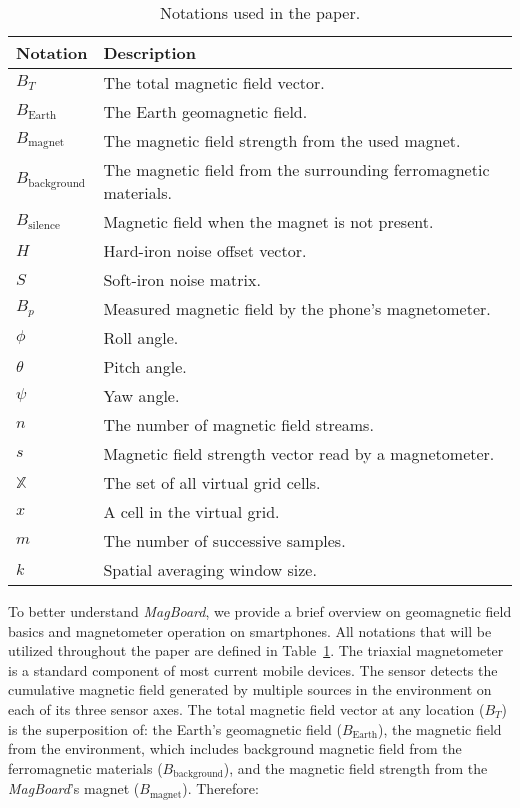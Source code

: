 \documentclass[conference]{IEEEtran}
\def \sys {\textit{MagBoard}}
\begin{document}
\begin{table}[!t]
    \centering
    \begin{tabular}{|l|p{6.5cm}|} \hline
      \textbf{Notation} & \textbf{Description} \\ \hline \hline
      $B_T$ &  The total magnetic field vector.\\ \hline 
      $B_{\textrm{Earth}}$ &  The Earth geomagnetic field. \\ \hline
      $B_{\textrm{magnet}}$ & The magnetic field strength from the used magnet. \\ \hline
      $B_{\textrm{background}}$ & The magnetic field from the surrounding ferromagnetic materials.\\ \hline
      $B_{\textrm{silence}}$ & Magnetic field when the magnet is not present.\\ \hline
      $H$ & Hard-iron noise offset vector. \\ \hline
      $S$ & Soft-iron noise matrix. \\ \hline
      $B_p$ & Measured magnetic field by the phone's magnetometer.\\ \hline
      $\phi$ & Roll angle. \\ \hline
      $\theta$ & Pitch angle. \\ \hline
      $\psi$ & Yaw angle. \\ \hline
       $n$ & The number of magnetic field streams. \\ \hline
       $s$ & Magnetic field strength vector read by a magnetometer. \\ \hline
       $\mathbb{X}$ & The set of all virtual grid cells. \\ \hline
       $x$ & A cell in the virtual grid.\\ \hline
       $m$ & The number of successive samples. \\ \hline
       $k$ & Spatial averaging window size. \\ \hline

  \end{tabular}
    \caption{Notations used in the paper.}
    \label{tab:notations}
    \vspace{-0.2in}
\end{table}

To better understand \sys{}, we provide a brief overview on geomagnetic field basics and magnetometer operation on smartphones. All notations that will be utilized throughout the paper are defined in Table~\ref{tab:notations}. The triaxial magnetometer is a standard component of most current mobile devices. 
The sensor detects the cumulative magnetic field generated by multiple sources in the environment on each of its three sensor axes. The total magnetic field vector at any location ($B_T$) is the superposition of: the Earth's geomagnetic field ($B_{\textrm{Earth}}$), the magnetic field from the environment, which includes background magnetic field from the ferromagnetic materials ($B_{\textrm{background}}$), and the magnetic field strength from the \sys{}'s magnet ($B_{\textrm{magnet}}$). Therefore:
\end{document}
